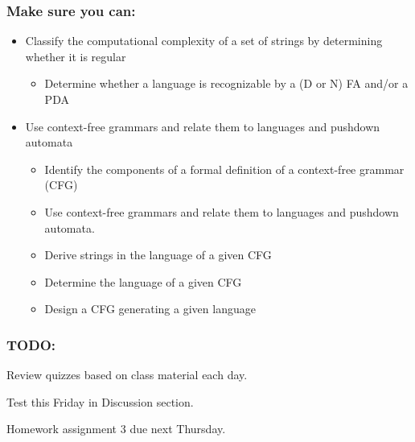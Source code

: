 \subsubsection*{Make sure you can:}
\begin{itemize}
\item Classify the computational complexity of a set of strings by determining whether it is regular
    \begin{itemize}
        \item Determine whether a language is recognizable by a (D or N) FA and/or a PDA
    \end{itemize}
\item Use context-free grammars and relate them to languages and pushdown automata
    \begin{itemize}
        \item Identify the components of a formal definition of a context-free grammar (CFG)
        \item Use context-free grammars and relate them to languages and pushdown automata.
        \item Derive strings in the language of a given CFG
        \item Determine the language of a given CFG
        \item Design a CFG generating a given language
    \end{itemize}
\end{itemize}

\subsubsection*{TODO:}
\begin{list}
   {\itemsep2pt}
   \item Review quizzes based on class material each day.
   \item Test this Friday in Discussion section.
   \item Homework assignment 3 due next Thursday.
\end{list}


